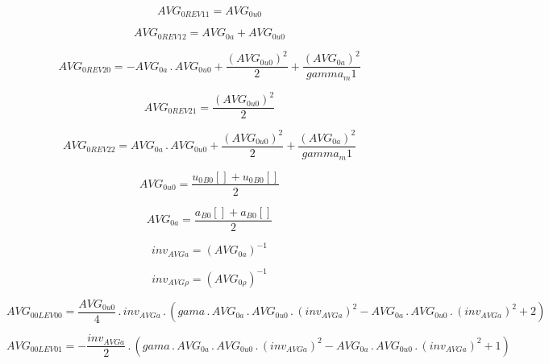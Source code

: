 \documentclass{article}
\begin{document}
\begin{dmath}AVG_{0 REV 11} = AVG_{0 u0}\end{dmath}

\begin{dmath}AVG_{0 REV 12} = AVG_{0 a} + AVG_{0 u0}\end{dmath}

\begin{dmath}AVG_{0 REV 20} = - AVG_{0 a} \,.\, AVG_{0 u0} + \frac{\left(AVG_{0 u0} \right)^{2}}{2} + \frac{\left(AVG_{0 a} \right)^{2}}{gamma_m1}\end{dmath}

\begin{dmath}AVG_{0 REV 21} = \frac{\left(AVG_{0 u0} \right)^{2}}{2}\end{dmath}

\begin{dmath}AVG_{0 REV 22} = AVG_{0 a} \,.\, AVG_{0 u0} + \frac{\left(AVG_{0 u0} \right)^{2}}{2} + \frac{\left(AVG_{0 a} \right)^{2}}{gamma_m1}\end{dmath}

\begin{dmath}AVG_{0 u0} = \frac{{u_{0}{_{B0}}}[{}] + {u_{0}{_{B0}}}[{}]}{2}\end{dmath}

\begin{dmath}AVG_{0 a} = \frac{{a{_{B0}}}[{}] + {a{_{B0}}}[{}]}{2}\end{dmath}

\begin{dmath}inv_{AVG a} = \left(AVG_{0 a} \right)^{-1}\end{dmath}

\begin{dmath}inv_{AVG \rho} = \left(AVG_{0 \rho} \right)^{-1}\end{dmath}

\begin{dmath}AVG_{0 0 LEV 00} = \frac{AVG_{0 u0}}{4} \,.\, inv_{AVG a} \,.\, \left(gama \,.\, AVG_{0 a} \,.\, AVG_{0 u0} \,.\, \left(inv_{AVG a} \right)^{2} - AVG_{0 a} \,.\, AVG_{0 u0} \,.\, \left(inv_{AVG a} \right)^{2} + 2\right)\end{dmath}

\begin{dmath}AVG_{0 0 LEV 01} = - \frac{inv_{AVG a}}{2} \,.\, \left(gama \,.\, AVG_{0 a} \,.\, AVG_{0 u0} \,.\, \left(inv_{AVG a} \right)^{2} - AVG_{0 a} \,.\, AVG_{0 u0} \,.\, \left(inv_{AVG a} \right)^{2} + 1\right)\end{dmath}
\end{document}
